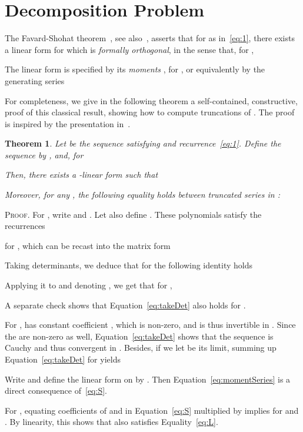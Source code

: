 \documentclass{elsart}
\newtheorem{Theorem}{Theorem}
\def\proof{\textsc{Proof.} }
\def\foorp{\hfill}
\begin{document}
\section{Decomposition Problem}\label{sec:decomp}

The Favard-Shohat theorem~\cite{Favard35,Shohat36}, see
also~\cite[Theorem 4.4]{Chihara78}, asserts that for  as
in~\eqref{eq:1}, there exists a linear form  for which
 is {\it formally orthogonal}, in the sense that, for ,
 
The linear form  is specified by its {\it moments} , for , or equivalently by the generating series 

For completeness, we give in the following theorem a self-contained,
constructive, proof of this classical result, showing how to compute
truncations of . The proof is inspired by the presentation
in~\cite[Section~3]{Flajolet80}.

\begin{Theorem}
Let  be the sequence satisfying  and recurrence~\eqref{eq:1}.
 Define the sequence  by  ,  and, for 
  
Then, there exists a -linear form  such that
	
Moreover, for any , the following equality holds between truncated series in
:
	
\end{Theorem}

\proof For , write  and
. Let also define . These polynomials satisfy the recurrences

for , which 
can be recast into the matrix form

Taking determinants, we deduce that for  the following identity holds

Applying it to  and denoting , we get  that for ,

A separate check shows that Equation~\eqref{eq:takeDet} also holds for . 

For ,  has constant coefficient
, which is non-zero, and is thus invertible in
. Since the  are non-zero as well,
Equation~\eqref{eq:takeDet} shows that the sequence
 is Cauchy and thus convergent in
. Besides, if we let  be its limit, summing up
Equation~\eqref{eq:takeDet} for  yields

 Write  and define the linear form  on
   by . Then Equation~\eqref{eq:momentSeries} is
  a direct consequence of~\eqref{eq:S}.
  
  For , equating coefficients of  and
 in Equation~\eqref{eq:S} multiplied by 
implies  for  and .  By linearity, this shows that 
also satisfies Equality~\eqref{eq:L}.  \foorp
\end{document}
